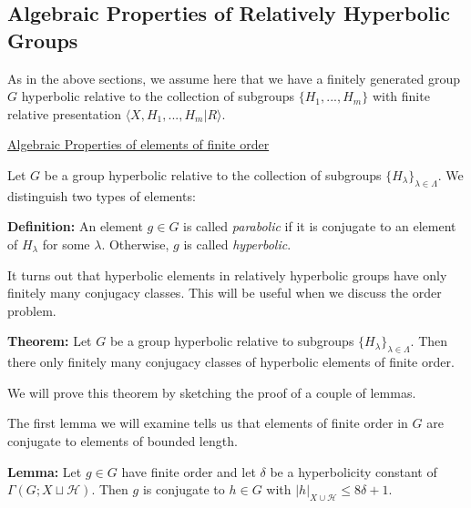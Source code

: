 \documentclass[12pt]{article}
\newcommand{\vs}{\vskip10pt}
\begin{document}
	
	
	\subsection{Algebraic Properties of Relatively Hyperbolic Groups}
	
	As in the above sections, we assume here that we have a finitely generated group $G$ hyperbolic relative to the collection of subgroups $\{H_1,...,H_m\}$ with finite relative presentation $\langle X, H_1,...,H_m \vert R \rangle$. 
	
	\vs
	
	\underline{Algebraic Properties of elements of finite order}
	
	\vs 
	
	Let $G$ be a group hyperbolic relative to the collection of subgroups $\{H_{\lambda}\}_{\lambda \in \Lambda}$. We distinguish two types of elements: 
	
	\vs 
	
	\textbf{Definition: } An element $g \in G$ is called \textit{parabolic} if it is conjugate to an element of $H_{\lambda}$ for some $\lambda$. Otherwise, $g$ is called \textit{hyperbolic}. 
	
	\vs 
	
	It turns out that hyperbolic elements in relatively hyperbolic groups have only finitely many conjugacy classes. This will be useful when we discuss the order problem.
	
	\vs 
	
	\textbf{Theorem: } Let $G$ be a group hyperbolic relative to subgroups $\{H_{\lambda}\}_{\lambda \in \Lambda}$. Then there only finitely many conjugacy classes of hyperbolic elements of finite order. 
	
	\vs 
	
	We will prove this theorem by sketching the proof of a couple of lemmas. 
	
	\vs 
	
	The first lemma we will examine tells us that elements of finite order in $G$ are conjugate to elements of bounded length. 
	
	\vs 
	
	\textbf{Lemma: } Let $g \in G$ have finite order and let $\delta$ be a hyperbolicity constant of $\Gamma(G; X \sqcup \mathcal{H})$. Then $g$ is conjugate to $h \in G$ with $\vert h \vert_{X \cup \mathcal{H}} \leq 8 \delta + 1$. 
	
\end{document}
